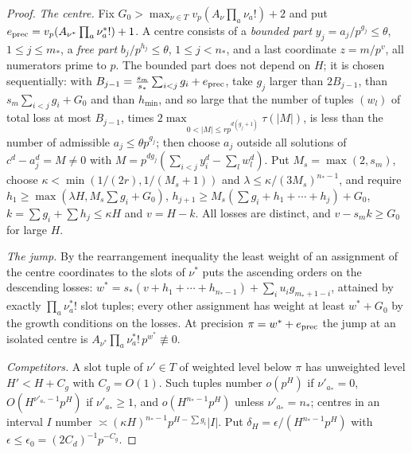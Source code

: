 \documentclass[11pt]{article}
\begin{document}
\begin{proof}
\emph{The centre.} Fix $G_0>\max_{\nu\in T}v_p(A_\nu\prod_a\nu_a!)+2$ and put
$e_{\rm prec}=v_p(A_{\nu^*}\prod_a\nu^*_a!)+1$. A centre consists of a \emph{bounded part}
$y_j=a_j/p^{g_j}\le\theta$, $1\le j\le m_*$, a \emph{free part} $b_j/p^{h_j}\le\theta$, $1\le j<n_*$, and a last
coordinate $z=m/p^v$, all numerators prime to $p$. The bounded part does not depend on $H$; it is chosen
sequentially: with $B_{j-1}=\frac{s_m}{s_*}\sum_{i<j}g_i+e_{\rm prec}$, take $g_j$ larger than $2B_{j-1}$,
than $s_m\sum_{i<j}g_i+G_0$ and than $h_{\min}$, and so large that the number of tuples $(w_l)$ of total loss at
most $B_{j-1}$, times $2\max_{0<|M|\le rp^{d(g_j+1)}}\tau(|M|)$, is less than the number of admissible
$a_j\le\theta p^{g_j}$; then choose $a_j$ outside all solutions of $c^d-a_j^d=M\ne0$ with
$M=p^{dg_j}(\sum_{i<j}y_i^d-\sum_lw_l^d)$. Put $M_s=\max(2,s_m)$, choose $\kappa<\min(1/(2r),1/(M_s+1))$ and
$\lambda\le\kappa/(3M_s)^{n_*-1}$, and require $h_1\ge\max(\lambda H,M_s\sum g_i+G_0)$,
$h_{j+1}\ge M_s(\sum g_i+h_1+\cdots+h_j)+G_0$, $k=\sum g_i+\sum h_j\le\kappa H$ and $v=H-k$. All losses are
distinct, and $v-s_mk\ge G_0$ for large $H$.

\emph{The jump.} By the rearrangement inequality the least weight of an assignment of the centre
coordinates to the slots of $\nu^*$ puts the ascending orders on the descending losses:
$w^*=s_*(v+h_1+\cdots+h_{n_*-1})+\sum_iu_ig_{m_*+1-i}$, attained by exactly $\prod_a\nu^*_a!$ slot tuples;
every other assignment has weight at least $w^*+G_0$ by the growth conditions on the losses. At precision
$\pi=w^*+e_{\rm prec}$ the jump at an isolated centre is $A_{\nu^*}\prod_a\nu^*_a!\,p^{w^*}\not\equiv0$.

\emph{Competitors.} A slot tuple of $\nu'\in T$ of weighted level below $\pi$ has unweighted level
$H'<H+C_g$ with $C_g=O(1)$. Such tuples number $o(p^H)$ if $\nu'_{a_*}=0$, $O(H^{\nu'_{a_*}-1}p^H)$ if
$\nu'_{a_*}\ge1$, and $o(H^{n_*-1}p^H)$ unless $\nu'_{a_*}=n_*$; centres in an interval $I$ number
$\asymp(\kappa H)^{n_*-1}p^{H-\sum g_i}|I|$. Put $\delta_H=\epsilon/(H^{n_*-1}p^H)$ with
$\epsilon\le\epsilon_0=(2C_d)^{-1}p^{-C_g}$.


\end{proof}
\end{document}

